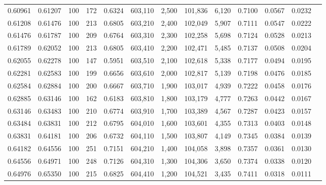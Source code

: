 \begin{tabular}{rrrrrrrrrrrrr}
0.60961 & 0.61207 &   100 & 172 &                                     0.6324 & 603,110 &   2,500 & 101,836 &   6,120 & 0.7100 & 0.0567 & 0.0232 \\
0.61208 & 0.61476 &   100 & 213 &                                     0.6805 & 603,210 &   2,400 & 102,049 &   5,907 & 0.7111 & 0.0547 & 0.0222 \\
0.61476 & 0.61787 &   100 & 209 &                                     0.6764 & 603,310 &   2,300 & 102,258 &   5,698 & 0.7124 & 0.0528 & 0.0213 \\
0.61789 & 0.62052 &   100 & 213 &                                     0.6805 & 603,410 &   2,200 & 102,471 &   5,485 & 0.7137 & 0.0508 & 0.0204 \\
0.62055 & 0.62278 &   100 & 147 &                                     0.5951 & 603,510 &   2,100 & 102,618 &   5,338 & 0.7177 & 0.0494 & 0.0195 \\
0.62281 & 0.62583 &   100 & 199 &                                     0.6656 & 603,610 &   2,000 & 102,817 &   5,139 & 0.7198 & 0.0476 & 0.0185 \\
0.62584 & 0.62884 &   100 & 200 &                                     0.6667 & 603,710 &   1,900 & 103,017 &   4,939 & 0.7222 & 0.0458 & 0.0176 \\
0.62885 & 0.63146 &   100 & 162 &                                     0.6183 & 603,810 &   1,800 & 103,179 &   4,777 & 0.7263 & 0.0442 & 0.0167 \\
0.63146 & 0.63483 &   100 & 210 &                                     0.6774 & 603,910 &   1,700 & 103,389 &   4,567 & 0.7287 & 0.0423 & 0.0157 \\
0.63484 & 0.63831 &   100 & 212 &                                     0.6795 & 604,010 &   1,600 & 103,601 &   4,355 & 0.7313 & 0.0403 & 0.0148 \\
0.63831 & 0.64181 &   100 & 206 &                                     0.6732 & 604,110 &   1,500 & 103,807 &   4,149 & 0.7345 & 0.0384 & 0.0139 \\
0.64182 & 0.64556 &   100 & 251 &                                     0.7151 & 604,210 &   1,400 & 104,058 &   3,898 & 0.7357 & 0.0361 & 0.0130 \\
0.64556 & 0.64971 &   100 & 248 &                                     0.7126 & 604,310 &   1,300 & 104,306 &   3,650 & 0.7374 & 0.0338 & 0.0120 \\
0.64976 & 0.65350 &   100 & 215 &                                     0.6825 & 604,410 &   1,200 & 104,521 &   3,435 & 0.7411 & 0.0318 & 0.0111 \\

\end{tabular}
